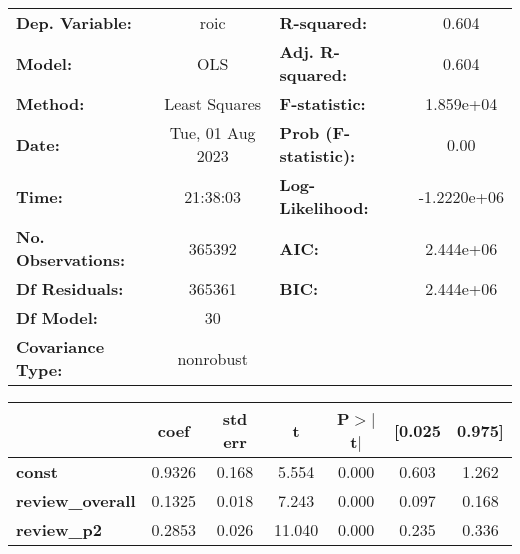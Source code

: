 \begin{center}
\begin{tabular}{lclc}
\toprule
\textbf{Dep. Variable:}                                               &       roic       & \textbf{  R-squared:         } &      0.604   \\
\textbf{Model:}                                                       &       OLS        & \textbf{  Adj. R-squared:    } &      0.604   \\
\textbf{Method:}                                                      &  Least Squares   & \textbf{  F-statistic:       } &  1.859e+04   \\
\textbf{Date:}                                                        & Tue, 01 Aug 2023 & \textbf{  Prob (F-statistic):} &      0.00    \\
\textbf{Time:}                                                        &     21:38:03     & \textbf{  Log-Likelihood:    } & -1.2220e+06  \\
\textbf{No. Observations:}                                            &      365392      & \textbf{  AIC:               } &  2.444e+06   \\
\textbf{Df Residuals:}                                                &      365361      & \textbf{  BIC:               } &  2.444e+06   \\
\textbf{Df Model:}                                                    &          30      & \textbf{                     } &              \\
\textbf{Covariance Type:}                                             &    nonrobust     & \textbf{                     } &              \\
\bottomrule
\end{tabular}
\begin{tabular}{lcccccc}
                                                                      & \textbf{coef} & \textbf{std err} & \textbf{t} & \textbf{P$> |$t$|$} & \textbf{[0.025} & \textbf{0.975]}  \\
\midrule
\textbf{const}                                                        &       0.9326  &        0.168     &     5.554  &         0.000        &        0.603    &        1.262     \\
\textbf{review\_overall}                                              &       0.1325  &        0.018     &     7.243  &         0.000        &        0.097    &        0.168     \\
\textbf{review\_p2}                                                   &       0.2853  &        0.026     &    11.040  &         0.000        &        0.235    &        0.336     \\

\end{tabular}
\end{center}
